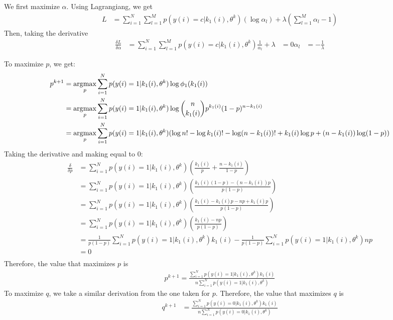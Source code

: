 We first maximize $\alpha$. Using Lagrangiang, we get
\begin{align*}
L &= \sum_{i=1}^{N} \sum_{l=1}^{M} p(y(i) = c | k_1(i), \theta^{k}) (\log \alpha_l) + \lambda(\sum_{l=1}^{M} \alpha_l - 1)
\end{align*}
Then, taking the derivative
\begin{align*}
\frac{\delta L}{\delta \alpha} &= \sum_{i=1}^{N} \sum_{l=1}^{M} p(y(i) = c | k_1(i), \theta^{k}) \frac{1}{\alpha_l} + \lambda &= 0
\alpha_l &= -\frac{1}{\lambda} 
\end{align*}


To maximize $p$, we get:
\begin{align*}
p^{k+1} &= \operatorname*{\arg\!\max}_p \sum_{i=1}^{N}  p(y(i) = 1 | k_1(i), \theta^{k}) \log \phi_1(k_1(i)) \\
&= \operatorname*{\arg\!\max}_p \sum_{i=1}^{N}  p(y(i) = 1 | k_1(i), \theta^{k}) \log \binom{n}{k_1(i)} p^{k_1(i)} (1-p)^{n-k_1(i)}  \\
&= \operatorname*{\arg\!\max}_p \sum_{i=1}^{N}  p(y(i) = 1 | k_1(i), \theta^{k}) (\log n! - \log k_1(i)! - \log (n-k_1(i))! + k_1(i) \log p + (n-k_1(i)) \log (1-p))
\end{align*}
Taking the derivative and making equal to 0:
\begin{align*}
\frac{\delta}{\delta p} &= \sum_{i=1}^{N}  p(y(i) = 1 | k_1(i), \theta^{k}) \left( \frac{k_1(i)}{p} + \frac{n-k_1(i)}{1-p} \right) \\
&= \sum_{i=1}^{N}  p(y(i) = 1 | k_1(i), \theta^{k}) \left( \frac{k_1(i)(1-p) - (n-k_1(i))p}{p(1-p)}
\right) \\
&= \sum_{i=1}^{N}  p(y(i) = 1 | k_1(i), \theta^{k}) \left( \frac{k_1(i)- k_1(i)p - np +k_1(i)p}{p(1-p)} \right) \\
&= \sum_{i=1}^{N}  p(y(i) = 1 | k_1(i), \theta^{k}) \left( \frac{k_1(i)- np}{p(1-p)} \right) \\
&= \frac{1}{p(1-p)} \sum_{i=1}^{N} p(y(i) = 1 | k_1(i), \theta^{k}) k_1(i) - \frac{1}{p(1-p)} \sum_{i=1}^{N} p(y(i) = 1 | k_1(i), \theta^{k}) np \\
&= 0 \\
\end{align*}
Therefore, the value that maximizes $p$ is
\begin{align*}
p^{k+1} = \frac{\sum_{i=1}^{N} p(y(i) = 1 | k_1(i), \theta^{k}) k_1(i)}{n \sum_{i=1}^{N} p(y(i) = 1 | k_1(i), \theta^{k})}
\end{align*}
To maximize $q$, we take a similar derivation from the one taken for $p$. Therefore, the value that maximizes $q$ is
\begin{align*}
q^{k+1} &= \frac{\sum_{i=1}^{N} p(y(i) = 0 | k_1(i), \theta^{k}) k_1(i)}{n \sum_{i=1}^{N} p(y(i) = 0 | k_1(i), \theta^{k})}
\end{align*}


